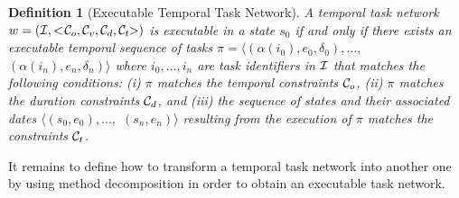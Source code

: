 \documentclass[letterpaper]{article} %
\newtheorem{definition}{Definition}
\newcommand{\name}{\text{\it name}}
\newcommand{\task}{\text{\it task}}
\newcommand{\tn}{\text{\it tn}}
\begin{document}
  \begin{definition}[Executable Temporal Task Network] A temporal task network $w = ({\cal{I}}, <\!{\cal{C}}_o, {\cal{C}}_v, {\cal{C}}_d, {\cal{C}}_t\!\!>)$ is executable in a state $s_0$ if and only if there exists an executable temporal sequence of tasks $\pi = \langle (\alpha(i_0), e_0, \delta_0), \ldots,$ $(\alpha(i_n), e_n, \delta_n)\rangle$  where $i_0, \ldots, i_n$ are task identifiers in $\cal{I}$ that matches the following conditions: (i) $\pi$ matches the temporal constraints ${\cal{C}}_o$, (ii) $\pi$ matches the duration constraints ${\cal{C}}_d$, and (iii) the sequence of states and their associated dates $\langle (s_0, e_0), \ldots,$ $(s_n, e_n) \rangle$ resulting from the execution of $\pi$ matches the constraints ${\cal{C}}_t$.
  \end{definition}

  It remains to define how to transform a temporal task network into another one by using method decomposition in order to obtain an executable task network.
%

\end{document}
